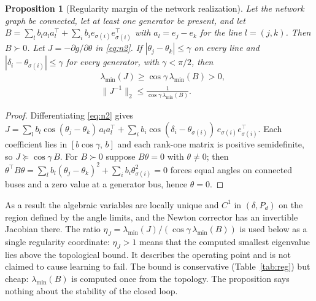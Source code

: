 \documentclass[preprint,12pt]{elsarticle}
\newtheorem{proposition}{Proposition}
\begin{document}
\begin{proposition}[Regularity margin of the network realization]
\label{prop:network}
Let the network graph be connected, let at least one generator be present, and let $B=\sum_l b_l a_la_l^\top+\sum_i b_i e_{\sigma(i)}e_{\sigma(i)}^\top$ with $a_l=e_j-e_k$ for the line $l=(j,k)$. Then $B\succ0$. Let $J=-\partial g/\partial\theta$ in \eqref{eq:n2}. If $|\theta_j-\theta_k|\le\gamma$ on every line and $|\delta_i-\theta_{\sigma(i)}|\le\gamma$ for every generator, with $\gamma<\pi/2$, then
\begin{equation}
\begin{split}&\lambda_{\min}(J)\ge\cos\gamma\,\lambda_{\min}(B)>0,\\ &\|J^{-1}\|_2\le \frac{1}{\cos\gamma\,\lambda_{\min}(B)} .\end{split}
\label{eq:cert}
\end{equation}
\end{proposition}
\begin{proof}
Differentiating \eqref{eq:n2} gives $J=\sum_l b_l\cos(\theta_j-\theta_k)\,a_la_l^\top+\sum_i b_i\cos(\delta_i-\theta_{\sigma(i)})\,e_{\sigma(i)}e_{\sigma(i)}^\top$. Each coefficient lies in $[b\cos\gamma,\,b]$ and each rank-one matrix is positive semidefinite, so $J\succeq\cos\gamma\,B$. For $B\succ0$ suppose $B\theta=0$ with $\theta\ne0$; then $\theta^\top B\theta=\sum_l b_l(\theta_j-\theta_k)^2+\sum_i b_i\theta_{\sigma(i)}^2=0$ forces equal angles on connected buses and a zero value at a generator bus, hence $\theta=0$.
\end{proof}
As a result the algebraic variables are locally unique and $C^1$ in $(\delta,P_d)$ on the region defined by the angle limits, and the Newton corrector has an invertible Jacobian there. The ratio $\eta_J=\lambda_{\min}(J)/(\cos\gamma\,\lambda_{\min}(B))$ is used below as a single regularity coordinate: $\eta_J>1$ means that the computed smallest eigenvalue lies above the topological bound. It describes the operating point and is not claimed to cause learning to fail. The bound is conservative (Table~\ref{tab:reg}) but cheap: $\lambda_{\min}(B)$ is computed once from the topology. The proposition says nothing about the stability of the closed loop.
\end{document}
